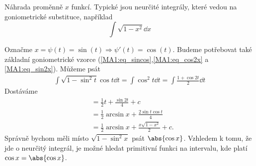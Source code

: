 \begin{mdframed}[style=mdexam]
  \begin{example}\label{MAI:exam122} 
    Náhrada proměnně \(x\) funkcí. Typické jsou neurčité integrály, které vedou na goniometrické
    substituce, například
    \[\int\sqrt{1-x^2}\dd{x}\]
    
    Označme \(x=\psi(t)=\sin(t)  \Rightarrow \psi'(t)=\cos(t)\). Budeme potřebovat také základní
    goniometrické vzorce (\ref{MA1:eq_sincos},\ref{MA1:eq_cos2x} a \ref{MA1:eq_sin2x}). Můžeme psát
    \begin{gather*}
      \int\sqrt{1-\sin^2t}\cos t\dd{t} 
        = \int\cos^2 t \dd{t}  = \int\frac{1+\cos2t}{2}\dd{t}                         
    \end{gather*}
    Dostáváme
    \begin{align*}
        &= \frac{1}{2}t+\frac{\sin2t}{4}+c                       \\
        &= \frac{1}{2}\arcsin x + \frac{2\sin t\cos t}{4}        \\
        &= \frac{1}{2}\arcsin x + \frac{x\sqrt{1-x^2}}{2} + c.
    \end{align*}
    Správně bychom měli místo \(\sqrt{1 - \sin^2x}\) psát \(\abs{\cos x}\). Vzhledem k tomu, že 
    jde o neurčitý integrál, je možné hledat primitivní funkci na intervalu, kde platí \(\cos x 
    = \abs{\cos x}\).
  \end{example}
\end{mdframed}